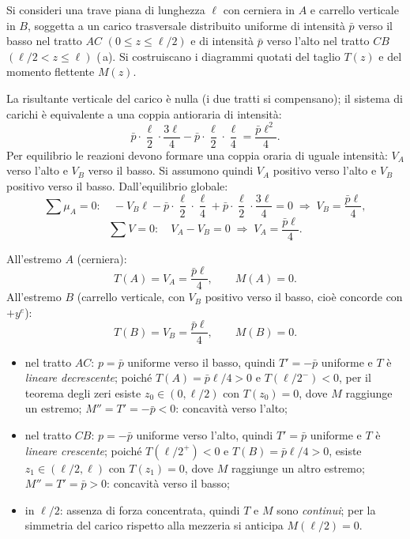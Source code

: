\begin{esempio}
	Si consideri una trave piana di lunghezza $\ell$
	con cerniera in $A$ e carrello verticale in $B$,
	soggetta a un carico trasversale distribuito
	uniforme di intensità $\bar{p}$ verso il basso
	nel tratto $AC$ $(0 \leq z \leq \ell/2)$ e di
	intensità $\bar{p}$ verso l'alto nel tratto $CB$
	$(\ell/2 < z \leq \ell)$ (\,a).
	Si costruiscano i diagrammi quotati del taglio $T(z)$
	e del momento flettente $M(z)$.
	
	\begin{svolgimento}
		



		
		
		La risultante verticale del carico è nulla
		(i due tratti si compensano); il sistema di
		carichi è equivalente a una coppia antioraria
		di intensità:
		\[
		\bar{p}\cdot\frac{\ell}{2}\cdot\frac{3\ell}{4}
		- \bar{p}\cdot\frac{\ell}{2}\cdot\frac{\ell}{4}
		= \frac{\bar{p}\ell^2}{4}.
		\]
		Per equilibrio le reazioni devono formare una
		coppia oraria di uguale intensità: $V_A$ verso
		l'alto e $V_B$ verso il basso.
		Si assumono quindi $V_A$ positivo verso l'alto
		e $V_B$ positivo verso il basso.
		Dall'equilibrio globale:
		\[
		\sum \mu_A = 0:\quad
		-V_B\ell
		- \bar{p}\cdot\frac{\ell}{2}\cdot\frac{\ell}{4}
		+ \bar{p}\cdot\frac{\ell}{2}\cdot\frac{3\ell}{4}
		= 0
		\;\Rightarrow\;
		V_B = \frac{\bar{p}\ell}{4},
		\]
		\[
		\sum V = 0:\quad
		V_A - V_B = 0
		\;\Rightarrow\;
		V_A = \frac{\bar{p}\ell}{4}.
		\]
		
		All'estremo $A$ (cerniera):
		\[
		T(A) = V_A = \frac{\bar{p}\ell}{4}, \qquad M(A) = 0.
		\]
		All'estremo $B$ (carrello verticale, con $V_B$
		positivo verso il basso, cioè concorde con $+y^e$):
		\[
		T(B) = V_B = \frac{\bar{p}\ell}{4}, \qquad M(B) = 0.
		\]
		
		\begin{itemize}[nosep]
			\item nel tratto $AC$: $p = \bar{p}$ uniforme
			verso il basso, quindi $T' = -\bar{p}$
			uniforme e $T$ è \emph{lineare
				decrescente}; poiché $T(A) = \bar{p}\ell/4
			> 0$ e $T(\ell/2^-) < 0$, per il teorema
			degli zeri esiste $z_0 \in (0,\ell/2)$
			con $T(z_0) = 0$, dove $M$ raggiunge un
			estremo; $M'' = T' = -\bar{p} < 0$:
			concavità verso l'alto;
			\item nel tratto $CB$: $p = -\bar{p}$ uniforme
			verso l'alto, quindi $T' = \bar{p}$
			uniforme e $T$ è \emph{lineare crescente};
			poiché $T(\ell/2^+) < 0$ e $T(B) =
			\bar{p}\ell/4 > 0$, esiste $z_1 \in
			(\ell/2,\ell)$ con $T(z_1) = 0$, dove
			$M$ raggiunge un altro estremo; $M'' =
			T' = \bar{p} > 0$: concavità verso il
			basso;
			\item in $\ell/2$: assenza di forza concentrata,
			quindi $T$ e $M$ sono \emph{continui};
			per la simmetria del carico rispetto alla
			mezzeria si anticipa $M(\ell/2) = 0$.
		\end{itemize}
		

\end{svolgimento}
\end{esempio}
